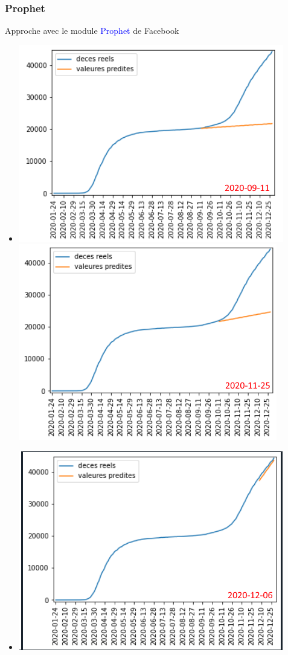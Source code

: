 \documentclass{beamer}
\begin{document}
\begin{frame}
	\frametitle{Prophet}
	Approche avec le module \textcolor{blue}{Prophet} de Facebook
	\begin{itemize}
		\centering
		\item[]\includegraphics[scale=0.4]{prophet_bpt}
		\includegraphics[scale=0.4]{prophet_mpt}
		\item[]\includegraphics[scale=0.4]{prophet_ppt}
	\end{itemize}
\end{frame}
\end{document}
